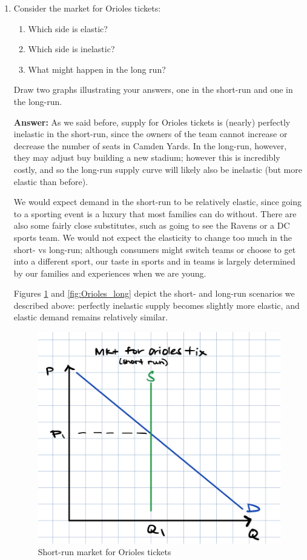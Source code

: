 \documentclass[12pt]{article}
\begin{document}
\begin{enumerate}
\item Consider the market for Orioles tickets:
\begin{enumerate}
    \item Which side is elastic?
    \item Which side is inelastic?
    \item What might happen in the long run?
\end{enumerate}

Draw two graphs illustrating your answers, one in the short-run and one in the long-run.

\textbf{Answer:}
As we said before, supply for Orioles tickets is (nearly) perfectly inelastic in the short-run, since the owners of the team cannot increase or decrease the number of seats in Camden Yards. In the long-run, however, they may adjust buy building a new stadium; however this is incredibly costly, and so the long-run supply curve will likely also be inelastic (but more elastic than before).

\vspace{2mm}

We would expect demand in the short-run to be relatively elastic, since going to a sporting event is a luxury that most families can do without. There are also some fairly close substitutes, such as going to see the Ravens or a DC sports team. We would not expect the elasticity to change too much in the short- vs long-run; although consumers might switch teams or choose to get into a different sport, our taste in sports and in teams is largely determined by our families and experiences when we are young. 

\vspace{2mm}

Figures \ref{fig:Orioles_short} and \ref{fig:Orioles_long} depict the short- and long-run scenarios we described above: perfectly inelastic supply becomes slightly more elastic, and elastic demand remains relatively similar.

\begin{figure}
    \centering
    \includegraphics[width=.6\textwidth]{Orioles_short.png}
    \caption{Short-run market for Orioles tickets}
    \label{fig:Orioles_short}
\end{figure}


\end{enumerate}
\end{document}
